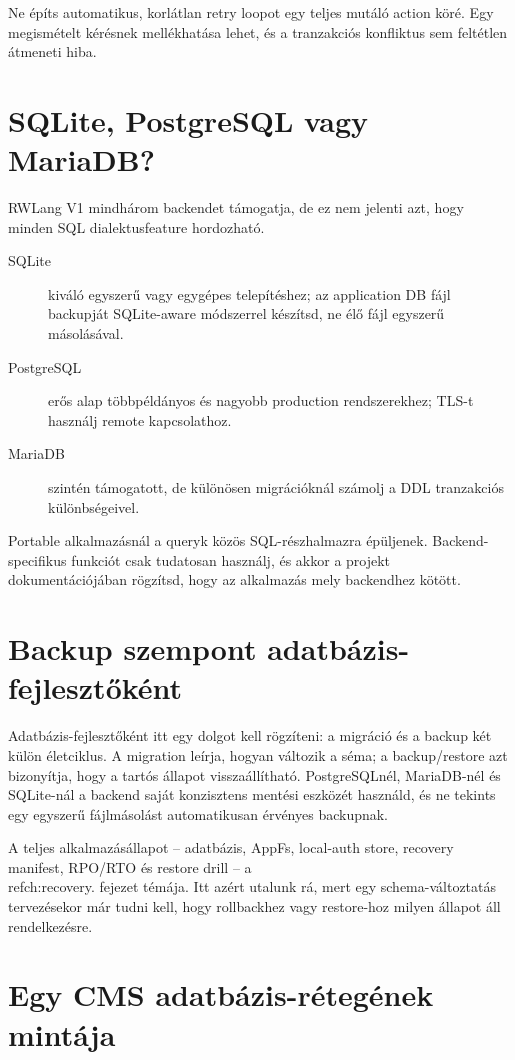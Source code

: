 Ne építs automatikus, korlátlan retry loopot egy teljes mutáló action köré. Egy megismételt kérésnek mellékhatása lehet, és a tranzakciós konfliktus sem feltétlen átmeneti hiba.

\section{SQLite, PostgreSQL vagy MariaDB?}

RWLang V1 mindhárom backendet támogatja, de ez nem jelenti azt, hogy minden SQL dialektusfeature hordozható.

\begin{description}
\item[SQLite] kiváló egyszerű vagy egygépes telepítéshez; az application DB fájl backupját SQLite-aware módszerrel készítsd, ne élő fájl egyszerű másolásával.
\item[PostgreSQL] erős alap többpéldányos és nagyobb production rendszerekhez; TLS-t használj remote kapcsolathoz.
\item[MariaDB] szintén támogatott, de különösen migrációknál számolj a DDL tranzakciós különbségeivel.
\end{description}

Portable alkalmazásnál a queryk közös SQL-részhalmazra épüljenek. Backend-specifikus funkciót csak tudatosan használj, és akkor a projekt dokumentációjában rögzítsd, hogy az alkalmazás mely backendhez kötött.

\section{Backup szempont adatbázis-fejlesztőként}

Adatbázis-fejlesztőként itt egy dolgot kell rögzíteni: a migráció és a backup két külön életciklus. A migration leírja, hogyan változik a séma; a backup/restore azt bizonyítja, hogy a tartós állapot visszaállítható. PostgreSQLnél, MariaDB-nél és SQLite-nál a backend saját konzisztens mentési eszközét használd, és ne tekints egy egyszerű fájlmásolást automatikusan érvényes backupnak.

A teljes alkalmazásállapot -- adatbázis, AppFs, local-auth store, recovery manifest, RPO/RTO és restore drill -- a \\ref{ch:recovery}. fejezet témája. Itt azért utalunk rá, mert egy schema-változtatás tervezésekor már tudni kell, hogy rollbackhez vagy restore-hoz milyen állapot áll rendelkezésre.

\section{Egy CMS adatbázis-rétegének mintája}

